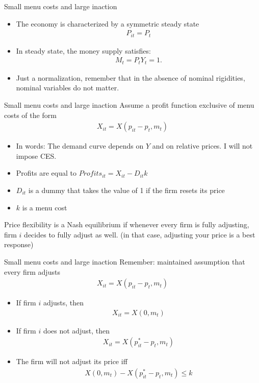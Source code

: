 \documentclass[11pt,aspectratio=169,xcolor={dvipsnames},hyperref={pdftex,pdfpagemode=UseNone,hidelinks,pdfdisplaydoctitle=true},usepdftitle=false]{beamer}
\begin{document}
\begin{frame}{Small menu costs and large inaction}
\begin{itemize}
\item The economy is characterized by a symmetric steady state
\begin{align*}
P_{it} = P_t 
\end{align*}
\item In steady state, the money supply satisfies:
\begin{align}
M_t = P_t Y_t = 1.
\end{align}
\item Just a normalization, remember that in the absence of nominal rigidities, nominal variables do not matter.
\end{itemize}
\end{frame}

\begin{frame}{Small menu costs and large inaction}
Assume a profit function exclusive of menu costs of the form 
\begin{align}
X_{it} = X\left(p_{it} - p_t, m_t\right)
\end{align}
\begin{itemize}
\item In words: The demand curve depends on $Y$ and on relative prices. I will not impose CES.
\item Profits are equal to $Profits_{it} = X_{it} - D_{it} k$
\item $D_{it}$ is a dummy that takes the value of 1 if the firm resets its price
\item $k$ is a menu cost
\end{itemize}
Price flexibility is a Nash equilibrium if whenever every firm is fully adjusting, firm $i$ decides to fully adjust as well. (in that case, adjusting your price is a best response)
\end{frame}

\begin{frame}{Small menu costs and large inaction}
Remember: maintained assumption that every firm adjusts
\begin{align}
X_{it} = X\left(p_{it} - p_t, m_t\right) 
\end{align}
\begin{itemize}
\item If firm $i$ adjusts, then 
\begin{align*}
X_{it} =  X\left(0, m_t\right)
\end{align*}
\item If firm $i$ does not adjust, then
\begin{align*}
X_{it} =  X\left(p^*_{it} - p_t, m_t\right)
\end{align*}
\item The firm will not adjust its price iff
\begin{align*}
X\left(0, m_t\right) -  X\left(p^*_{it} - p_t, m_t\right) \leq k
\end{align*}
\end{itemize}
\end{frame}
\end{document}
